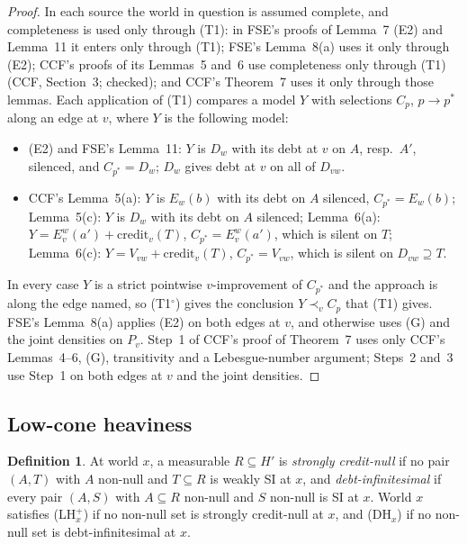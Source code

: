 \documentclass[11pt]{article}
\theoremstyle{definition}\newtheorem{definition}[theorem]{Definition}
\theoremstyle{remark}\newtheorem{remark}[theorem]{Remark}
\newcommand{\cred}{\mathrm{credit}}
\newcommand{\To}{\textup{(T1$^\circ$)}}
\begin{document}
\begin{proof}
In each source the world in question is assumed complete, and completeness
is used only through (T1): in FSE's proofs of Lemma~7 (E2) and Lemma~11 it
enters only through (T1); FSE's Lemma~8(a) uses it only through (E2); CCF's
proofs of its Lemmas~5 and~6 use completeness only through (T1) (CCF,
Section~3; checked); and CCF's Theorem~7 uses it only through those lemmas. Each application of (T1)
compares a model $Y$ with selections $C_{p}$, $p\to p^*$ along an edge at
$v$, where $Y$ is the following model:
\begin{itemize}[leftmargin=*,itemsep=1pt]
\item (E2) and FSE's Lemma~11: $Y$ is $D_w$ with its debt at $v$ on $A$,
resp.\ $A'$, silenced, and $C_{p^*}=D_w$; $D_w$ gives debt at $v$ on all of
$D_{vw}$.
\item CCF's Lemma~5(a): $Y$ is $E_w(b)$ with its debt on $A$ silenced,
$C_{p^*}=E_w(b)$; Lemma~5(c): $Y$ is $D_w$ with its debt on $A$ silenced;
Lemma~6(a): $Y=E^w_v(a')+\cred_v(T)$, $C_{p^*}=E^w_v(a')$, which is silent
on $T$; Lemma~6(c): $Y=V_{vw}+\cred_v(T)$, $C_{p^*}=V_{vw}$, which is silent
on $D_{vw}\supseteq T$.
\end{itemize}
In every case $Y$ is a strict pointwise $v$-improvement of $C_{p^*}$ and the
approach is along the edge named, so \To{} gives the conclusion
$Y\prec_vC_p$ that (T1) gives. FSE's Lemma~8(a) applies (E2) on both edges
at $v$, and otherwise uses (G) and the joint densities on $P_v$. Step~1 of
CCF's proof of Theorem~7 uses only CCF's Lemmas~4--6, (G), transitivity and
a Lebesgue-number argument; Steps~2 and~3 use Step~1 on both edges at $v$
and the joint densities.
\end{proof}

\subsection{Low-cone heaviness}\label{sec:LH}

\begin{definition}\label{def:sCN}
At world $x$, a measurable $R\subseteq H'$ is \emph{strongly credit-null}
if no pair $(A,T)$ with $A$ non-null and $T\subseteq R$ is weakly SI at $x$,
and \emph{debt-infinitesimal} if every pair $(A,S)$ with $A\subseteq R$
non-null and $S$ non-null is SI at $x$. World $x$ satisfies (LH$^+_x$) if no
non-null set is strongly credit-null at $x$, and (DH$_x$) if no non-null set
is debt-infinitesimal at $x$.
\end{definition}
\end{document}
